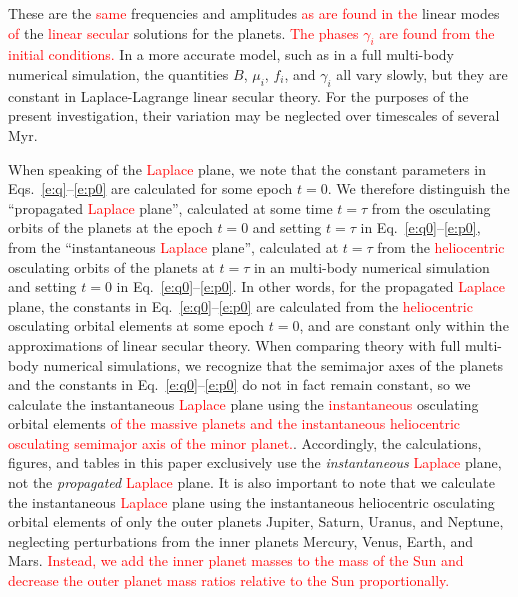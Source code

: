 \documentclass[a4paper,fleqn]{cas-sc}
\begin{document}
\begin{linenumbers}
These are the \textcolor{red}{same} frequencies and amplitudes \textcolor{red}{as are found in the} linear modes \textcolor{red}{of} the \textcolor{red}{linear secular} solutions for the planets.
\textcolor{red}{The phases $\gamma_i$ are found from the initial conditions.}
In a more accurate model, such as in a full multi-body numerical simulation, the quantities $B$, $\mu_i$, $f_i$, and $\gamma_i$ all vary slowly, but they are constant in Laplace-Lagrange linear secular theory.
For the purposes of the present investigation, their variation may be neglected over timescales of several Myr.




When speaking of the \textcolor{red}{Laplace} plane, we note that the constant parameters in Eqs.~\ref{e:q}--\ref{e:p0} are calculated for some epoch $t=0$.
We therefore distinguish the ``propagated \textcolor{red}{Laplace} plane'', calculated at some time $t=\tau$ from the osculating orbits of the planets at the epoch $t=0$ and setting $t=\tau$ in Eq.~\ref{e:q0}--\ref{e:p0}, from the ``instantaneous \textcolor{red}{Laplace} plane'', calculated at $t=\tau$ from the \textcolor{red}{heliocentric} osculating orbits of the planets at $t=\tau$ in an multi-body numerical simulation and setting $t=0$ in Eq.~\ref{e:q0}--\ref{e:p0}.
In other words, for the propagated \textcolor{red}{Laplace} plane, the constants in Eq.~\ref{e:q0}--\ref{e:p0} are calculated from the \textcolor{red}{heliocentric} osculating orbital elements at some epoch $t=0$, and are constant only within the approximations of linear secular theory.
When comparing theory with full multi-body numerical simulations, we recognize that the semimajor axes of the planets and the constants in Eq.~\ref{e:q0}--\ref{e:p0} do not in fact remain constant, so we calculate the instantaneous \textcolor{red}{Laplace} plane using the \textcolor{red}{instantaneous} osculating orbital elements \textcolor{red}{of the massive planets and the instantaneous heliocentric osculating semimajor axis of the minor planet.}.
Accordingly, the calculations, figures, and tables in this paper exclusively use the \textit{instantaneous} \textcolor{red}{Laplace} plane, not the \textit{propagated} \textcolor{red}{Laplace} plane.
It is also important to note that we calculate the instantaneous \textcolor{red}{Laplace} plane using the instantaneous heliocentric osculating orbital elements of only the outer planets Jupiter, Saturn, Uranus, and Neptune, neglecting perturbations from the inner planets Mercury, Venus, Earth, and Mars.
\textcolor{red}{Instead, we add the inner planet masses to the mass of the Sun and decrease the outer planet mass ratios relative to the Sun proportionally.}


\end{linenumbers}
\end{document}
